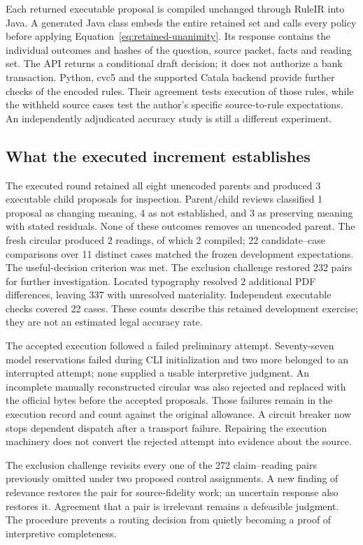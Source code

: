 \documentclass[12pt,a4paper,oneside,openany]{book}
\begin{document}
Each returned executable proposal is compiled unchanged through RuleIR into
Java. A generated Java class embeds the entire retained set and calls every
policy before applying Equation~\eqref{eq:retained-unanimity}. Its response
contains the individual outcomes and hashes of the question, source packet,
facts and reading set. The API returns a conditional draft decision; it does
not authorize a bank transaction. Python, cvc5 and the supported Catala backend
provide further checks of the encoded rules. Their agreement tests execution
of those rules, while the withheld source cases test the author's specific
source-to-rule expectations. An independently adjudicated accuracy study is
still a different experiment.

\subsection{What the executed increment establishes}

The executed round retained all eight unencoded parents and produced 3 executable child proposals for inspection. Parent/child reviews classified 1 proposal as changing meaning, 4 as not established, and 3 as preserving meaning with stated residuals. None of these outcomes removes an unencoded parent. The fresh circular produced 2 readings, of which 2 compiled; 22 candidate--case comparisons over 11 distinct cases matched the frozen development expectations. The useful-decision criterion was met. The exclusion challenge restored 232 pairs for further investigation. Located typography resolved 2 additional PDF differences, leaving 337 with unresolved materiality. Independent executable checks covered 22 cases. These counts describe this retained development exercise; they are not an estimated legal accuracy rate.

The accepted execution followed a failed preliminary attempt. Seventy-seven
model reservations failed during CLI initialization and two more belonged to
an interrupted attempt; none supplied a usable interpretive judgment. An
incomplete manually reconstructed circular was also rejected and replaced with
the official bytes before the accepted proposals. Those failures remain in the
execution record and count against the original allowance. A circuit breaker
now stops dependent dispatch after a transport failure. Repairing the execution
machinery does not convert the rejected attempt into evidence about the source.

The exclusion challenge revisits every one of the 272 claim--reading pairs
previously omitted under two proposed control assignments. A new finding of
relevance restores the pair for source-fidelity work; an uncertain response
also restores it. Agreement that a pair is irrelevant remains a defeasible
judgment. The procedure prevents a routing decision from quietly becoming a
proof of interpretive completeness.
\end{document}
